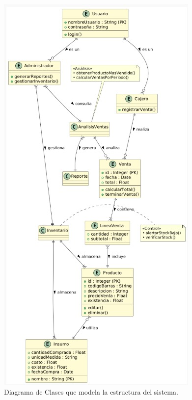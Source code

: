 \documentclass[conference]{IEEEtran}
\begin{document}
\begin{figure}[htbp]
\centerline{\includegraphics[width=\columnwidth]{images/diagrama_clases.jpg}}
\caption{Diagrama de Clases que modela la estructura del sistema.}
\label{fig:clases}
\end{figure}
\end{document}
